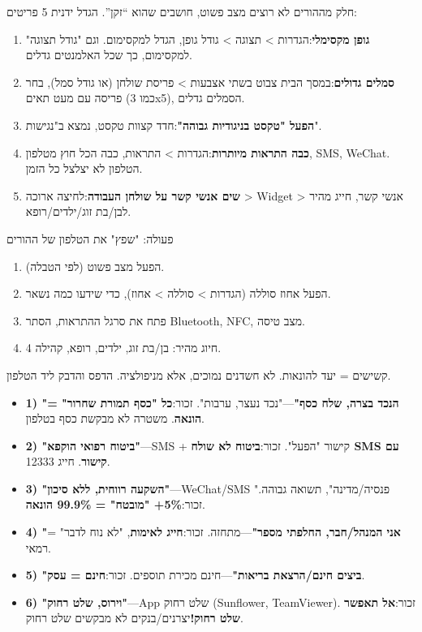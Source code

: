 
חלק מההורים לא רוצים מצב פשוט, חושבים שהוא “זקן”. הגדל ידנית 5 פריטים:

\begin{enumerate}
  \item \textbf{גופן מקסימלי}:הגדרות > תצוגה > גודל גופן, הגדל למקסימום. וגם "גודל תצוגה" למקסימום, כך שכל האלמנטים גדלים.
  \item \textbf{סמלים גדולים}:במסך הבית צבוט בשתי אצבעות > פריסת שולחן (או גודל סמל), בחר פריסה עם מעט תאים (כמו 3x5), הסמלים גדלים.
  \item \textbf{הפעל "טקסט בניגודיות גבוהה"}:חדד קצוות טקסט, נמצא ב"נגישות".
  \item \textbf{כבה התראות מיותרות}:הגדרות > התראות, כבה הכל חוץ מטלפון, SMS, WeChat. הטלפון לא יצלצל כל הזמן.
  \item \textbf{שים אנשי קשר על שולחן העבודה}:לחיצה ארוכה > Widget > אנשי קשר, חייג מהיר לבן/בת זוג/ילדים/רופא.
\end{enumerate}

\begin{tcbpractice}{פעולה: "שפץ" את הטלפון של ההורים}
\begin{enumerate}
  \item הפעל מצב פשוט (לפי הטבלה).
  \item הפעל אחוז סוללה (הגדרות > סוללה > אחוז), כדי שידעו כמה נשאר.
  \item פתח את סרגל ההתראות, הסתר Bluetooth, NFC, מצב טיסה.
  \item 4 חיוג מהיר: בן/בת זוג, ילדים, רופא, קהילה.
\end{enumerate}

\end{tcbpractice}


קשישים = יעד להונאות. לא חשדנים נמוכים, אלא מניפולציה. הדפס והדבק ליד הטלפון.


\begin{itemize}
  \item \textbf{1) "הנכד בצרה, שלח כסף"}—"נכד נעצר, ערבות". זכור:\textbf{כל "כסף תמורת שחרור" = הונאה}. משטרה לא מבקשת כסף בטלפון.
  \item \textbf{2) "ביטוח רפואי הוקפא"}—SMS + קישור "הפעל". זכור:\textbf{ביטוח לא שולח SMS עם קישור}. חייג 12333.
  \item \textbf{3) "השקעה רווחית, ללא סיכון"}—WeChat/SMS "פנסיה/מדינה", תשואה גבוהה. זכור:\textbf{5\%+ "מובטח" = 99.9\% הונאה}.
  \item \textbf{4) "אני המנהל/חבר, החלפתי מספר"}—מתחזה. זכור:\textbf{חייג לאימות}, "לא נוח לדבר" = רמאי.
  \item \textbf{5) "ביצים חינם/הרצאת בריאות"}—חינם מכירת תוספים. זכור:\textbf{חינם = עסק}.
  \item \textbf{6) "וירוס, שלט רחוק"}—App שלט רחוק (Sunflower, TeamViewer). זכור:\textbf{אל תאפשר שלט רחוק!}יצרנים/בנקים לא מבקשים שלט רחוק.
\end{itemize}

